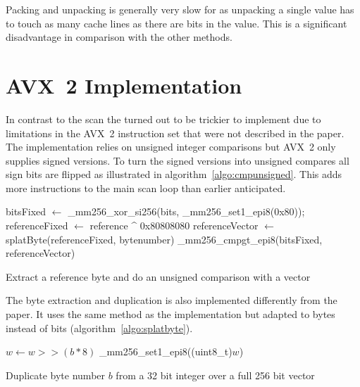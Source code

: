 Packing and unpacking is generally very slow for \bwv{} as unpacking a single
value has to touch as many cache lines as there are bits in the value. This is a
significant disadvantage in comparison with the other methods.

\section{AVX~2 \bs{} Implementation}

In contrast to the \bwv{} scan the \bs{} turned out to be trickier to implement
due to limitations in the AVX~2 instruction set that were not described in the
\bs{} paper. The implementation relies on unsigned integer comparisons but AVX~2
only supplies signed versions. To turn the signed versions into unsigned
compares all sign bits are flipped as illustrated in
algorithm~\ref{algo:cmpunsigned}. This adds more instructions to the main scan
loop than earlier anticipated.

\begin{algorithm}[h]
\begin{algorithmic}[1]
  \State bitsFixed $\gets$ \_mm256\_xor\_si256(bits, \_mm256\_set1\_epi8(0x80));
  \State referenceFixed $\gets$ reference \^{} 0x80808080
  \State referenceVector $\gets$ splatByte(referenceFixed, bytenumber)
  \State \Return \_mm256\_cmpgt\_epi8(bitsFixed, referenceVector)
  \EndProcedure
\end{algorithmic}
\caption{Extract a reference byte and do an unsigned comparison with a vector}
\label{algo:cmpunsigned}
\end{algorithm}

The byte extraction and duplication is also implemented differently from the
paper. It uses the same method as the \bwv{} implementation but adapted to bytes
instead of bits (algorithm~\ref{algo:splatbyte}).

\begin{algorithm}[h]
\begin{algorithmic}[1]
  \State $w \gets w >> (b * 8)$ 
  \State \Return \_mm256\_set1\_epi8((uint8\_t)$w$) 
  \EndProcedure
\end{algorithmic}
\caption{Duplicate byte number $b$ from a 32 bit integer over a full 256 bit vector}
\label{algo:splatbyte}
\end{algorithm}

